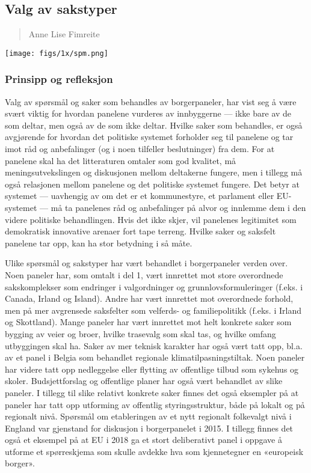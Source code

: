 \documentclass[
  12pt,
  a4paper, 12pt]{article}
\begin{document}
\hypertarget{valg-av-sakstyper}{%
\subsection{Valg av sakstyper}\label{valg-av-sakstyper}}

\begin{quote}
Anne Lise Fimreite
\end{quote}

\texttt{[image: figs/1x/spm.png]}

\hypertarget{prinsipp-og-refleksjon}{%
\subsubsection{Prinsipp og refleksjon}\label{prinsipp-og-refleksjon}}

Valg av spørsmål og saker som behandles av borgerpaneler, har vist seg å være svært viktig for hvordan panelene vurderes av innbyggerne --- ikke bare av de som deltar, men også av de som ikke deltar. Hvilke saker som behandles, er også avgjørende for hvordan det politiske systemet forholder seg til panelene og tar imot råd og anbefalinger (og i noen tilfeller beslutninger) fra dem. For at panelene skal ha det litteraturen omtaler som god kvalitet, må meningsutvekslingen og diskusjonen mellom deltakerne fungere, men i tillegg må også relasjonen mellom panelene og det politiske systemet fungere. Det betyr at systemet --- uavhengig av om det er et kommunestyre, et parlament eller EU-systemet --- må ta panelenes råd og anbefalinger på alvor og innlemme dem i den videre politiske behandlingen. Hvis det ikke skjer, vil panelenes legitimitet som demokratisk innovative arenaer fort tape terreng. Hvilke saker og saksfelt panelene tar opp, kan ha stor betydning i så måte.

Ulike spørsmål og sakstyper har vært behandlet i borgerpaneler verden over. Noen paneler har, som omtalt i del 1, vært innrettet mot store overordnede sakskomplekser som endringer i valgordninger og grunnlovsformuleringer (f.eks. i Canada, Irland og Island). Andre har vært innrettet mot overordnede forhold, men på mer avgrensede saksfelter som velferds- og familiepolitikk (f.eks. i Irland og Skottland). Mange paneler har vært innrettet mot helt konkrete saker som bygging av veier og broer, hvilke trasevalg som skal tas, og hvilke omfang utbyggingen skal ha. Saker av mer teknisk karakter har også vært tatt opp, bl.a. av et panel i Belgia som behandlet regionale klimatilpasningstiltak. Noen paneler har videre tatt opp nedleggelse eller flytting av offentlige tilbud som sykehus og skoler. Budsjettforslag og offentlige planer har også vært behandlet av slike paneler. I tillegg til slike relativt konkrete saker finnes det også eksempler på at paneler har tatt opp utforming av offentlig styringsstruktur, både på lokalt og på regionalt nivå. Spørsmål om etableringen av et nytt regionalt folkevalgt nivå i England var gjenstand for diskusjon i borgerpanelet i 2015. I tillegg finnes det også et eksempel på at EU i 2018 ga et stort deliberativt panel i oppgave å utforme et spørreskjema som skulle avdekke hva som kjennetegner en «europeisk borger».
\end{document}
